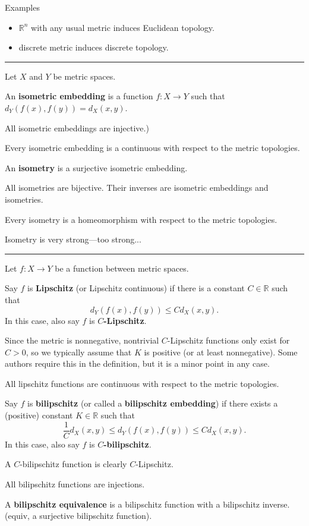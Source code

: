 \documentclass[12pt]{article}
\newcommand{\keyword}[1]{\textbf{#1}}
\newcommand{\sepline}{\rule{\textwidth}{0.4pt}}
\theoremstyle{definition}
\newcommand{\R}{\mathbb{R}}
\newcommand{\<}{\left\langle}
\renewcommand{\>}{\right\rangle}
\begin{document}
Examples

\begin{itemize}
    \item $\R^n$ with any usual metric induces Euclidean topology.
    \item discrete metric induces discrete topology.
\end{itemize}

\sepline

Let $X$ and $Y$ be metric spaces.

An \keyword{isometric embedding} is a function $f : X \to Y$ such that $d_Y(f(x), f(y)) = d_X(x, y)$.

All isometric embeddings are injective.)

Every isometric embedding is a continuous with respect to the metric topologies.

An \keyword{isometry} is a surjective isometric embedding.

All isometries are bijective.
Their inverses are isometric embeddings and isometries.

Every isometry is a homeomorphism with respect to the metric topologies.

Isometry is very strong---too strong...

\sepline

Let $f : X \to Y$ be a function between metric spaces.

Say $f$ is \keyword{Lipschitz} (or Lipschitz continuous) if there is a constant $C \in \R$ such that
\[
    d_Y(f(x), f(y)) \leq C d_X(x, y).
\]
In this case, also say $f$ is \keyword{$C$-Lipschitz}.

Since the metric is nonnegative, nontrivial $C$-Lipschitz functions only exist for $C > 0$, so we typically assume that $K$ is positive (or at least nonnegative).
Some authors require this in the definition, but it is a minor point in any case.

All lipschitz functions are continuous with respect to the metric topologies.

Say $f$ is \keyword{bilipschitz} (or called a \keyword{bilipschitz embedding}) if there exists a (positive) constant $K \in \R$ such that
\[
    \frac{1}{C} d_X(x, y) \leq d_Y(f(x), f(y)) \leq C d_X(x, y).
\]
In this case, also say $f$ is \keyword{$C$-bilipschitz}.

A $C$-bilipschitz function is clearly $C$-Lipschitz.

All bilipschitz functions are injections.

A \keyword{bilipschitz equivalence} is a bilipschitz function with a bilipschitz inverse. (equiv, a surjective bilipschitz function).
\end{document}
